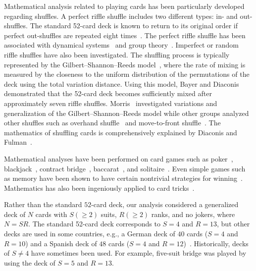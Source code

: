 \documentclass[pre, amsmath, floatfix]{revtex4-2}
\theoremstyle{plain}
\theoremstyle{definition}
\theoremstyle{remark}
\begin{document}
Mathematical analysis related to playing cards has been particularly developed regarding shuffles.
A perfect riffle shuffle includes two different types: in- and out-shuffles.
The standard 52-card deck is known to return to its original order if perfect out-shuffles are repeated eight times~\cite{MorrisBook}.
The perfect riffle shuffle has been associated with dynamical systems~\cite{Scully} and group theory~\cite{Diaconis}.
Imperfect or random riffle shuffles have also been investigated.
The shuffling process is typically represented by the Gilbert--Shannon--Reeds model~\cite{Bayer}, where the rate of mixing is measured by the closeness to the uniform distribution of the permutations of the deck using the total variation distance.
Using this model, Bayer and Diaconis~\cite{Bayer} demonstrated that the 52-card deck becomes sufficiently mixed after approximately seven riffle shuffles.
Morris~\cite{Morris} investigated variations and generalization of the Gilbert--Shannon--Reeds model while other groups analyzed other shuffles such as overhand shuffle~\cite{Jonasson} and move-to-front shuffle~\cite{Fill}.
The mathematics of shuffling cards is comprehensively explained by Diaconis and Fulman~\cite{DiaconisBook}.

Mathematical analyses have been performed on card games such as poker~\cite{Bowling}, blackjack~\cite{Baldwin}, contract bridge~\cite{Frank}, baccarat~\cite{Kemeny}, and solitaire~\cite{Longpre}.
Even simple games such as memory have been shown to have certain nontrivial strategies for winning~\cite{Zwick}.
Mathematics has also been ingeniously applied to card tricks~\cite{Gardner}.

Rather than the standard $52$-card deck, our analysis considered a generalized deck of $N$ cards with $S(\ge2)$ suits, $R(\ge2)$ ranks, and no jokers, where $N=SR$.
The standard 52-card deck corresponds to $S=4$ and $R=13$, but other decks are used in some countries, e.g., a German deck of $40$ cards ($S=4$ and $R=10$) and a Spanish deck of $48$ cards ($S=4$ and $R=12$)~\cite{Britannica}.
Historically, decks of $S\ne4$ have sometimes been used.
For example, five-suit bridge was played by using the deck of $S=5$ and $R=13$.
\end{document}
